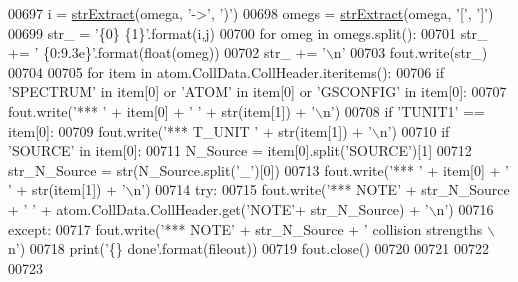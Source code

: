 \begin{DoxyCode}
00697         i = \hyperlink{namespacepyneb_1_1utils_1_1misc_aaf9c5249e3c3104e38854ca30f9df4b7}{strExtract}(omega, \textcolor{stringliteral}{'->'}, \textcolor{stringliteral}{')'})
00698         omegs = \hyperlink{namespacepyneb_1_1utils_1_1misc_aaf9c5249e3c3104e38854ca30f9df4b7}{strExtract}(omega, \textcolor{stringliteral}{'['}, \textcolor{stringliteral}{']'})
00699         str\_ = \textcolor{stringliteral}{'\{0\} \{1\}'}.format(i,j)
00700         \textcolor{keywordflow}{for} omeg \textcolor{keywordflow}{in} omegs.split():
00701             str\_ += \textcolor{stringliteral}{' \{0:9.3e\}'}.format(float(omeg))
00702         str\_ += \textcolor{stringliteral}{'\(\backslash\)n'}
00703         fout.write(str\_)
00704         
00705     \textcolor{keywordflow}{for} item \textcolor{keywordflow}{in} atom.CollData.CollHeader.iteritems():
00706         \textcolor{keywordflow}{if} \textcolor{stringliteral}{'SPECTRUM'} \textcolor{keywordflow}{in} item[0] \textcolor{keywordflow}{or} \textcolor{stringliteral}{'ATOM'} \textcolor{keywordflow}{in} item[0] \textcolor{keywordflow}{or} \textcolor{stringliteral}{'GSCONFIG'} \textcolor{keywordflow}{in} item[0]:
00707             fout.write(\textcolor{stringliteral}{'*** '} + item[0] + \textcolor{stringliteral}{' '} + str(item[1]) + \textcolor{stringliteral}{'\(\backslash\)n'})
00708         \textcolor{keywordflow}{if} \textcolor{stringliteral}{'TUNIT1'} == item[0]:
00709             fout.write(\textcolor{stringliteral}{'*** T\_UNIT '} + str(item[1]) + \textcolor{stringliteral}{'\(\backslash\)n'}) 
00710         \textcolor{keywordflow}{if} \textcolor{stringliteral}{'SOURCE'} \textcolor{keywordflow}{in} item[0]:
00711             N\_Source = item[0].split(\textcolor{stringliteral}{'SOURCE'})[1]
00712             str\_N\_Source = str(N\_Source.split(\textcolor{stringliteral}{'\_'})[0])
00713             fout.write(\textcolor{stringliteral}{'*** '} + item[0] + \textcolor{stringliteral}{' '} + str(item[1]) + \textcolor{stringliteral}{'\(\backslash\)n'})
00714             \textcolor{keywordflow}{try}:
00715                 fout.write(\textcolor{stringliteral}{'*** NOTE'} + str\_N\_Source + \textcolor{stringliteral}{' '} + atom.CollData.CollHeader.get(\textcolor{stringliteral}{'NOTE'}+
      str\_N\_Source)  + \textcolor{stringliteral}{'\(\backslash\)n'})
00716             \textcolor{keywordflow}{except}:
00717                 fout.write(\textcolor{stringliteral}{'*** NOTE'} + str\_N\_Source + \textcolor{stringliteral}{' collision strengths \(\backslash\)n'})
00718     print(\textcolor{stringliteral}{'\{\} done'}.format(fileout))
00719     fout.close()
00720     
00721     
00722     
00723 \end{DoxyCode}
\hypertarget{namespacepyneb_1_1utils_1_1manage__atomic__data_a9c992b2ae01f2e369be5d539172f78a0}{}
